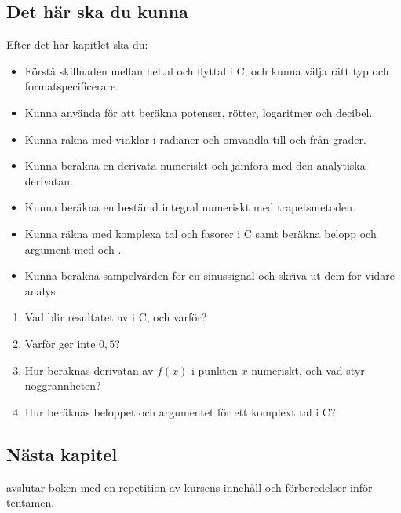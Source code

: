 \subsection*{Det här ska du kunna}
Efter det här kapitlet ska du:
\begin{itemize}
  \item Förstå skillnaden mellan heltal och flyttal i C, och kunna välja rätt typ och
    formatspecificerare.
  \item Kunna använda  för att beräkna potenser, rötter, logaritmer och decibel.
  \item Kunna räkna med vinklar i radianer och omvandla till och från grader.
  \item Kunna beräkna en derivata numeriskt och jämföra med den analytiska derivatan.
  \item Kunna beräkna en bestämd integral numeriskt med trapetsmetoden.
  \item Kunna räkna med komplexa tal och fasorer i C samt beräkna belopp och argument med
     och .
  \item Kunna beräkna sampelvärden för en sinussignal och skriva ut dem för vidare analys.
\end{itemize}

\testadigsjalv
\begin{enumerate}
  \item Vad blir resultatet av  i C, och varför?
  \item Varför ger  inte $0{,}5$?
  \item Hur beräknas derivatan av $f(x)$ i punkten $x$ numeriskt, och vad styr noggrannheten?
  \item Hur beräknas beloppet och argumentet för ett komplext tal i C?
\end{enumerate}

\subsection*{Nästa kapitel}
 avslutar boken med en repetition av kursens innehåll och förberedelser inför
tentamen.
